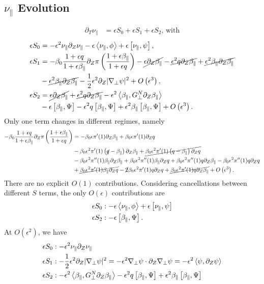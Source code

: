 \documentclass{article}
\newcommand{\para}{\parallel}
\newcommand{\ep}{\epsilon}
\newcommand{\np}{\nabla_\perp}
\newcommand{\p}{\partial}
\newcommand{\fr}{\frac{1+\ep q}{1+\ep\beta_\para}}
\newcommand{\frinv}{\frac{1+\ep\beta_\para}{1+\ep q}}
\newcommand{\GN}{G_\perp^N}
\newcommand{\pth} [1] {\left( #1 \right) }
\newcommand{\br} [1] {\left[ #1 \right] }
\begin{document}
\subsection{$\nu_\para$ Evolution}
\begin{align} 
    \p_T\nu_\para &= \ep S_0 + \ep S_1 + \ep S_2 \text{, with}
\end{align}
\begin{align*}
    \ep S_0 &= -\ep^2\nu_\para \p_Z\nu_\para - \ep\Braket{\nu_\para, \phi} + \ep\br{\nu_\para, \psi}, \\ 
    \ep  S_1 &= -\beta_0\fr\p_Z\pi\pth{\frinv} - \cancel{\ep\p_Z\beta_\para} - \cancel{\ep^2q\p_Z\beta_\para} + \cancel{\ep^2\beta_\para\p_Z\beta_\para} \\ 
        &- \cancel{\ep^2\beta_\para\p_Z\beta_\para} - \frac{1}{2}\ep^2\p_Z |\np\psi|^2 + O\pth{\ep^3}, \\ 
    \ep S_2 &= \cancel{\ep\p_Z\beta_\para} + \cancel{\ep^2 q\p_Z\beta_\para} - \ep^2\Braket{\beta_\para, \GN\p_Z\beta_\para} \\ 
        &- \ep\br{\beta_\para, \Psi} - \ep^2q\br{\beta_\para, \Psi} + \ep^2\beta_\para \br{\beta_\para, \Psi} + O\pth{\ep^3}. 
\end{align*}
Only one term changes in different regimes, namely 
\begin{align*}
    -\beta_0\fr\p_Z\pi\pth{\frinv} &= - \beta_0\ep\pi'(1) \p_Z\beta_\para + \beta_0\ep\pi'(1) \p_Zq \\ 
        &- \beta_0\ep^2\pi'(1) \pth{\cancel{q}-\beta_\para} \p_Z\beta_\para + \cancel{\beta_0\ep^2\pi'(1) \pth{q-\beta_\para} \p_Zq} \\ 
        &- \beta_0\ep^2\pi''(1) \beta_\para\p_Z \beta_\para + \beta_0\ep^2\pi''(1) \beta_\para\p_Zq + \beta_0\ep^2\pi''(1) q\p_Z\beta_\para - \beta_0\ep^2\pi''(1) q\p_Z q \\ 
        &+ \cancel{\beta_0\ep^2\pi'(1) \beta_\para\p_Zq} - \cancel{2}\beta_0\ep^2\pi'(1) q\p_Z q + \cancel{\beta_0\ep^2\pi'(1) q\p_Z\beta_\para} + O\pth{\ep^3}. 
\end{align*}
There are no explicit $O(1)$ contributions. Considering cancellations between different $S$ terms, the only $O(\ep)$ contributions are
\begin{align*}
    \ep S_0 &: - \ep\Braket{\nu_\para, \phi} + \ep\br{\nu_\para, \psi} \\ 
    \ep S_2 &: - \ep\br{\beta_\para, \Psi}. 
\end{align*}
At $O\pth{\ep^2}$, we have 
\begin{align*}
    \ep S_0 &: -\ep^2\nu_\para \p_Z\nu_\para \\ 
    \ep S_1 &: - \frac{1}{2}\ep^2\p_Z |\np\psi|^2 = -\ep^2\np\psi \cdot \p_Z\np\psi = -\ep^2 \Braket{\psi, \p_Z\psi} \\ 
    \ep S_2 &: - \ep^2\Braket{\beta_\para, \GN\p_Z\beta_\para} - \ep^2q\br{\beta_\para, \Psi} + \ep^2\beta_\para \br{\beta_\para, \Psi}
\end{align*}
\end{document}
